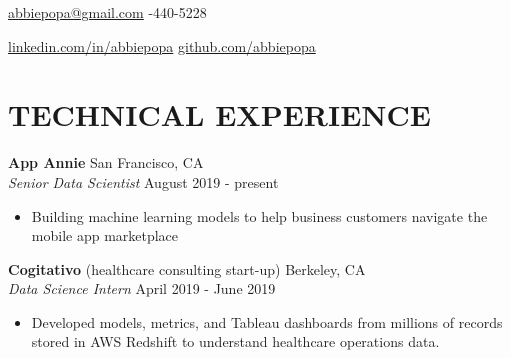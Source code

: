 \documentclass[line,margin,10pt]{res}
\begin{document}
 
\begin{resume}
\hoffset\centerline 
{\hyperref[abbiepopa@gmail.com]{abbiepopa@gmail.com} \quad \quad \quad \quad  \quad \quad \quad \quad \quad \quad \quad \quad \quad \quad \quad \quad \quad \quad \quad \quad \quad\quad \quad \quad \quad \quad \quad \quad \quad \quad \quad \quad  \quad \quad {}-440-5228}
\hoffset\centerline 
{\hspace{0.05cm} \hyperref[linkedin.com/in/abbiepopa]{linkedin.com/in/abbiepopa} \quad \quad \quad \quad \quad \quad \quad \quad \quad \quad \quad\quad \quad \quad \quad \quad \quad \quad \quad \quad \quad \quad  \quad \quad \quad  \quad \quad \quad   \quad \hyperref[github.com/abbiepopa]{github.com/abbiepopa}}
 


\section{TECHNICAL EXPERIENCE}
\textbf{App Annie} \hfill San Francisco, CA\\
{\sl Senior Data Scientist} \hfill August 2019 - present
\begin{itemize} \itemsep -2pt
\item Building machine learning models to help business customers navigate the mobile app marketplace
\end{itemize}

\textbf{Cogitativo} (healthcare consulting start-up) \hfill Berkeley, CA\\
{\sl Data Science Intern} \hfill April 2019 - June 2019
\begin{itemize} \itemsep -2pt
\item Developed models, metrics, and Tableau dashboards from millions of records stored in AWS Redshift to understand healthcare operations data.
\end{itemize}


\end{resume}
\end{document}

